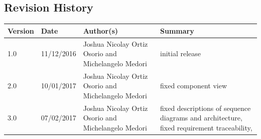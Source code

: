 \documentclass{article}
\begin{document}
\begin{flushleft}
\begin{itemize}
\end{itemize}

\subsection{Revision History}
  \begin{center}
    \begin{tabular}{ | p{2cm} | p{2cm} |  p{7 cm} | p{4cm} |}
    \hline
    \textbf{Version} &  \textbf{Date} & \textbf{Author(s)} & \textbf{Summary}  \\ 
    \hline
    
    1.0 & 11/12/2016 & Joshua Nicolay Ortiz Osorio and Michelangelo Medori & initial release
     \\ 
  \hline
  2.0 & 10/01/2017  & Joshua Nicolay Ortiz Osorio and Michelangelo Medori & fixed component view
  \\
  \hline
  
  3.0 & 07/02/2017  & Joshua Nicolay Ortiz Osorio and Michelangelo Medori & fixed descriptions of sequence diagrams and architecture, fixed requirement traceability,  
  \\
  \hline
 
  
    \end{tabular}
\end{center}


\end{flushleft}
\end{document}
